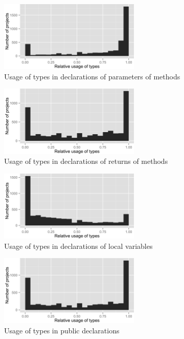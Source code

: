 \begin{figure}[h]
\centering 
\includegraphics[width=0.6\textwidth]{../aosd_2014/analysis/result/test/main/histograms/8_Method_Parameter.png} 
\caption{Usage of types in declarations of parameters of methods}
\end{figure}

\begin{figure}[h]
\centering 
\includegraphics[width=0.6\textwidth]{../aosd_2014/analysis/result/test/main/histograms/7_Method_Return.png} 
\caption{Usage of types in declarations of returns of methods}
\end{figure}

\begin{figure}[h]
\centering 
\includegraphics[width=0.6\textwidth]{../aosd_2014/analysis/result/test/main/histograms/6_Local_Variable.png} 
\caption{Usage of types in declarations of local variables}
\end{figure}

\begin{figure}[h]
\centering 
\includegraphics[width=0.6\textwidth]{../aosd_2014/analysis/result/test/main/histograms/13_Public.png} 
\caption{Usage of types in public declarations}
\end{figure}

